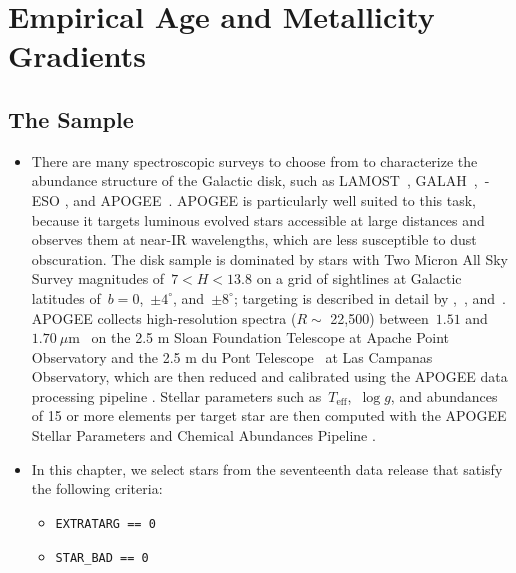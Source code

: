 
\section{Empirical Age and Metallicity Gradients}
\label{outflows:sec:empirical}

\subsection{The Sample}
\label{outflows:sec:empirical:apogee}

\begin{itemize}

	\item There are many spectroscopic surveys to choose from to characterize
	the abundance structure of the Galactic disk, such as
	LAMOST~\citep{Luo2015}, GALAH~\citep{DeSilva2015, Martell2017},~\gaia-ESO
	\citep{Gilmore2012}, and APOGEE~\citep{Majewski2017}.
	APOGEE is particularly well suited to this task, because it targets
	luminous evolved stars accessible at large distances and observes them at
	near-IR wavelengths, which are less susceptible to dust obscuration.
	The disk sample is dominated by stars with Two Micron All Sky Survey
	\citep{Skrutskie2006} magnitudes of~$7 < H < 13.8$ on a grid of
	sightlines at Galactic latitudes of~$b = 0$,~$\pm 4^\circ$,
	and~$\pm 8^\circ$; targeting is described in detail by
	\citet{Zasowski2013, Zasowski2017},~\citet{Beaton2021},
	and~\citet{Santana2021}.
	APOGEE collects high-resolution spectra ($R \sim$ 22,500) between~$1.51$
	and~$1.70~\mu$m~\citep{Wilson2019} on the 2.5 m Sloan Foundation Telescope
	\citep{Gunn2006} at Apache Point Observatory and the 2.5 m du Pont
	Telescope~\citep{Bowen1973} at Las Campanas Observatory, which are then
	reduced and calibrated using the APOGEE data processing pipeline
	\citep{Nidever2015}.
	Stellar parameters such as~$T_\text{eff}$,~$\log g$, and abundances of
	15 or more elements per target star are then computed with the APOGEE
	Stellar Parameters and Chemical Abundances Pipeline
	\citep[ASPCAP;][]{Holtzman2015, GarciaPerez2016}.

	\item In this chapter, we select stars from the seventeenth data release
	\citep[DR17;][]{Abdurrouf2022} that satisfy the following criteria:
	\begin{itemize}

		\item \texttt{EXTRATARG == 0}

		\item \texttt{STAR\_BAD == 0}


\end{itemize}
\end{itemize}
